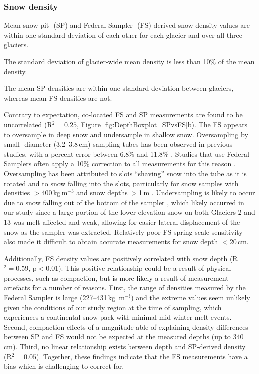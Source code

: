 \documentclass[twocolumn, letterpaper]{igs}
\begin{document}
\subsubsection{Snow density}


Mean snow pit- (SP) and Federal Sampler- (FS) derived snow density values are within one standard deviation of each other for each glacier and over all three glaciers. 

The standard deviation of glacier-wide mean density is less than 10\% of the mean density. 

The mean SP densities are within one standard deviation between glaciers, whereas mean FS densities are not. 


Contrary to expectation, co-located FS and SP measurements are found to be uncorrelated (R$^2=0.25$, Figure \ref{fig:DepthBoxplot_SPvsFS}b). The FS appears to oversample in deep snow and undersample in shallow snow. Oversampling by small- diameter (3.2--3.8\,cm) sampling tubes has been observed in previous studies, with a percent error between 6.8\% and 11.8\% \citep[e.g.][]{Work1965, Fames1982, Conger2009}. Studies that use Federal Samplers often apply a 10\% correction to all measurements for this reason \citep[e.g.][]{Molotch2005}. Oversampling has been attributed to slots ``shaving'' snow into the tube as it is rotated \citep[e.g.][]{Dixon2012} and to snow falling into the slots, particularly for snow samples with densities $>$400\,kg\,m$^{-3}$ and snow depths $>$1\,m \citep[e.g.][]{Beaumont1963}. Undersampling is likely to occur due to snow falling out of the bottom of the sampler \citep{Turcan1975}, which likely occurred in our study since a large portion of the lower elevation snow on both Glaciers 2 and 13 was melt affected and weak, allowing for easier lateral displacement of the snow as the sampler was extracted. Relatively poor FS spring-scale sensitivity also made it difficult to obtain accurate measurements for snow depth $<$20\,cm.

Additionally, FS density values are positively correlated with snow depth (R$^2= 0.59$, p$<$0.01). This positive relationship could be a result of physical processes, such as compaction, but is more likely a result of measurement artefacts for a number of reasons. First, the range of densities measured by the Federal Sampler is large (227--431\,kg\, m$^{-3}$) and the extreme values seem unlikely given the conditions of our study region at the time of sampling, which experiences a continental snow pack with minimal mid-winter melt events. Second, compaction effects of a magnitude able of explaining density differences between SP and FS would not be expected at the measured depths (up to 340\,cm). Third, no linear relationship exists between depth and SP-derived density (R$^2 = 0.05$). Together, these findings indicate that the FS measurements have a bias which is challenging to correct for.
\end{document}
